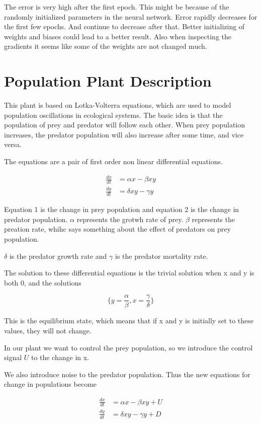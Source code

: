 \documentclass[12pt]{article}
\begin{document}
The error is very high after the first epoch. This might be because of the randomly initialized parameters in the neural
network. Error rapidly decreases for the first few epochs. And continue to decrease after that. Better initializing of weights
and biases could lead to a better result. Also when inspecting the gradients it seems like some of the weights are not changed
much.

\clearpage
\section*{Population Plant Description}

This plant is based on Lotka-Volterra equations, which are used to model population oscillations in ecological systems. The basic
idea is that the population of prey and predator will follow each other. When prey population increases, the predator population
will also increase after some time, and vice versa.

The equations are a pair of first order non linear differential equations. 

\begin{align}
    \frac{dx}{dt} &= \alpha x - \beta xy \\
    \frac{dy}{dt} &= \delta xy - \gamma y
\end{align}

Equation 1 is the change in prey population and equation 2 is the change in predator population. $\alpha$ represents the grotwh
rate of prey. $\beta$ represents the preation rate, whihc says something about the effect of predators on prey population.

$\delta$ is the predator growth rate and $\gamma$ is the predator mortality rate.

The solution to these differential equations is the trivial solution when x and y is both 0, and the solutions


\begin{equation}
    \{ y = \frac{\alpha}{\beta}, x = \frac{\gamma}{\delta}\}
\end{equation}

This is the equilibrium state, which means that if x and y is initially set to these values, they will not change.

In our plant we want to control the prey population, so we introduce the control signal $U$ to the change in x.

We also introduce noise to the predator population. Thus the new equations for change in populations become

\begin{align}
    \frac{dx}{dt} &= \alpha x - \beta xy + U \\
    \frac{dy}{dt} &= \delta xy - \gamma y + D
\end{align}


\printbibliography
\end{document}
